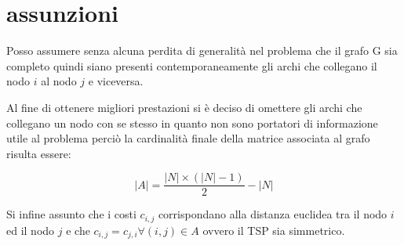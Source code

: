%
%
\section{assunzioni}
\label{pt1:assumption}
Posso assumere senza alcuna perdita di generalità nel problema che il grafo G sia completo quindi siano presenti contemporaneamente gli archi che collegano il nodo $i$ al nodo $j$ e viceversa.

Al fine di ottenere migliori prestazioni si è deciso di omettere gli archi che collegano un nodo con se stesso in quanto non sono portatori di informazione utile al problema perciò la cardinalità finale della matrice associata al grafo risulta essere:

\begin{equation}
\left|A\right| = \frac{\left|N\right|\times\left(\left|N\right|-1\right)}{2} - \left|N\right|
\end{equation}

Si infine assunto che i costi $c_{i,j}$ corrispondano alla distanza euclidea tra il nodo $i$ ed il nodo $j$ e che $c_{i,j}=c_{j,i} \forall (i,j)\in A$ ovvero il TSP sia simmetrico.